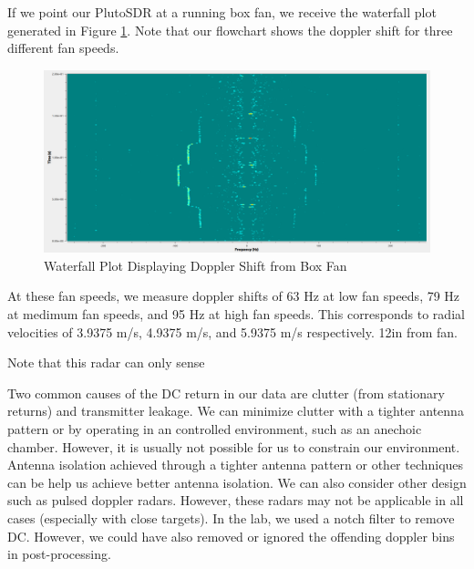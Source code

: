 \documentclass{article}
\begin{document}
If we point our PlutoSDR at a running box fan, we receive the waterfall plot generated in Figure \ref{fig::dopp_spectrum}. Note that our flowchart shows the doppler shift for three different fan speeds. 

\begin{figure}[H]
    	\centering
    \includegraphics[width=0.9\linewidth]{dopp_spectrum.png}
    	\caption{Waterfall Plot Displaying Doppler Shift from Box Fan}
    	\label{fig::dopp_spectrum}
\end{figure}

\noindent At these fan speeds, we measure doppler shifts of 63 Hz at low fan speeds, 79 Hz at medimum fan speeds, and 95 Hz at high fan speeds. This corresponds to radial velocities of 3.9375 m/s, 4.9375 m/s, and 5.9375 m/s respectively. 12in from fan.

Note that this radar can only sense 

Two common causes of the DC return in our data are clutter (from stationary returns) and transmitter leakage. We can minimize clutter with a tighter antenna pattern or by operating in an controlled environment, such as an anechoic chamber. However, it is usually not possible for us to constrain our environment. Antenna isolation achieved through a tighter antenna pattern or other techniques can be help us achieve better antenna isolation. We can also consider other design such as pulsed doppler radars. However, these radars may not be applicable in all cases (especially with close targets). In the lab, we used a notch filter to remove DC. However, we could have also removed or ignored the offending doppler bins in post-processing.
\end{document}
